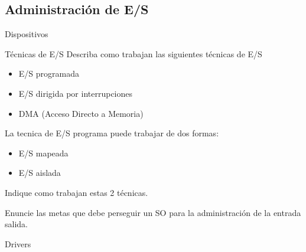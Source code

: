 
\begin{questions}

\section{Administración de E/S}

\question Dispositivos

\question Técnicas de E/S
Describa como trabajan las siguientes técnicas de E/S
\begin{itemize}
	\item E/S programada
	\item E/S dirigida por interrupciones
	\item DMA (Acceso Directo a Memoria)
\end{itemize}

\question La tecnica de E/S programa puede trabajar de dos formas:
\begin{itemize}
	\item E/S mapeada
	\item E/S aislada
\end{itemize}
Indique como trabajan estas 2 técnicas.

\question Enuncie las metas que debe perseguir un SO para la administración de la entrada salida.

\question Drivers
\end{questions}
